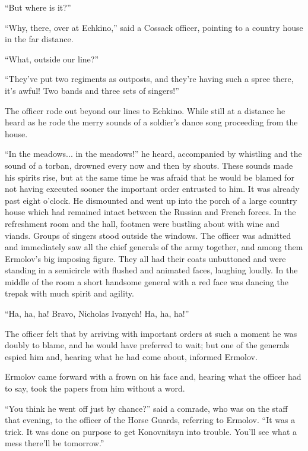 ``But where is it?''

``Why, there, over at Echkino,'' said a Cossack officer, pointing
to a country house in the far distance.

``What, outside our line?''

``They've put two regiments as outposts, and they're having such
a spree there, it's awful! Two bands and three sets of singers!''

The officer rode out beyond our lines to Echkino. While still at
a distance he heard as he rode the merry sounds of a soldier's
dance song proceeding from the house.

``In the meadows... in the meadows!'' he heard, accompanied by
whistling and the sound of a torban, drowned every now and then
by shouts. These sounds made his spirits rise, but at the same
time he was afraid that he would be blamed for not having
executed sooner the important order entrusted to him. It was
already past eight o'clock. He dismounted and went up into the
porch of a large country house which had remained intact between
the Russian and French forces. In the refreshment room and the
hall, footmen were bustling about with wine and viands. Groups of
singers stood outside the windows. The officer was admitted and
immediately saw all the chief generals of the army together, and
among them Ermolov's big imposing figure. They all had their
coats unbuttoned and were standing in a semicircle with flushed
and animated faces, laughing loudly. In the middle of the room a
short handsome general with a red face was dancing the trepak
with much spirit and agility.

``Ha, ha, ha! Bravo, Nicholas Ivanych! Ha, ha, ha!''

The officer felt that by arriving with important orders at such a
moment he was doubly to blame, and he would have preferred to
wait; but one of the generals espied him and, hearing what he had
come about, informed Ermolov.

Ermolov came forward with a frown on his face and, hearing what
the officer had to say, took the papers from him without a word.

``You think he went off just by chance?'' said a comrade, who was
on the staff that evening, to the officer of the Horse Guards,
referring to Ermolov. ``It was a trick. It was done on purpose to
get Konovnitsyn into trouble. You'll see what a mess there'll be
tomorrow.''


